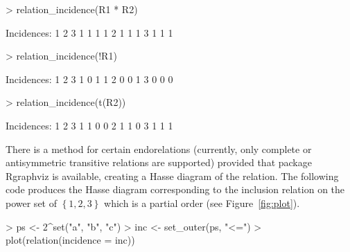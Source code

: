 \documentclass[fleqn]{article}
\newcommand{\pkg}[1]{{\normalfont\fontseries{b}\selectfont #1}}
\newcommand{\codefun}[1]{\code{#1()}}
\begin{document}
\begin{Schunk}
\begin{Sinput}
> relation_incidence(R1 * R2)
\end{Sinput}
\begin{Soutput}
Incidences:
  1 2 3
1 1 1 1
2 1 1 1
3 1 1 1
\end{Soutput}
\begin{Sinput}
> relation_incidence(!R1)
\end{Sinput}
\begin{Soutput}
Incidences:
  1 2 3
1 0 1 1
2 0 0 1
3 0 0 0
\end{Soutput}
\begin{Sinput}
> relation_incidence(t(R2))
\end{Sinput}
\begin{Soutput}
Incidences:
  1 2 3
1 1 0 0
2 1 1 0
3 1 1 1
\end{Soutput}
\end{Schunk}

There is a \codefun{plot} method for certain endorelations (currently,
only complete or antisymmetric transitive relations are supported)
provided that package \pkg{Rgraphviz} \citep{RWeka:Gentry+Long:2007} is
available, creating a Hasse diagram of the relation.  The following code
produces the Hasse diagram corresponding to the inclusion relation on
the power set of $\left\{1,2,3\right\}$ which is a partial order (see
Figure~\ref{fig:plot}).

\begin{Schunk}
\begin{Sinput}
> ps <- 2^set("a", "b", "c")
> inc <- set_outer(ps, "<=")
> plot(relation(incidence = inc))
\end{Sinput}
\end{Schunk}
\end{document}
